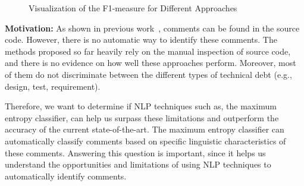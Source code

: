 \begin{figure}[!thb]
  \centering
  
  \caption{Visualization of the F1-measure for Different Approaches}
\end{figure}

\vspace{3mm}
\noindent\chapterIVrqi
\vspace{3mm}

\noindent \textbf{Motivation:} As shown in previous work~\cite{Maldonado2015MTD}, \SATD comments can be found in the source code. However, there is no automatic way to identify these comments. The methods proposed so far heavily rely on the manual inspection of source code, and there is no evidence on how well these approaches perform. Moreover, most of them do not discriminate between the different types of technical debt (e.g., design, test, requirement).

Therefore, we want to determine if NLP techniques such as, the maximum entropy classifier, can help us surpass these limitations and outperform the accuracy of the current state-of-the-art. The maximum entropy classifier can automatically classify comments based on specific linguistic characteristics of these comments. Answering this question is important, since it helps us understand the opportunities and limitations of using NLP techniques to automatically identify \SATD comments. 

